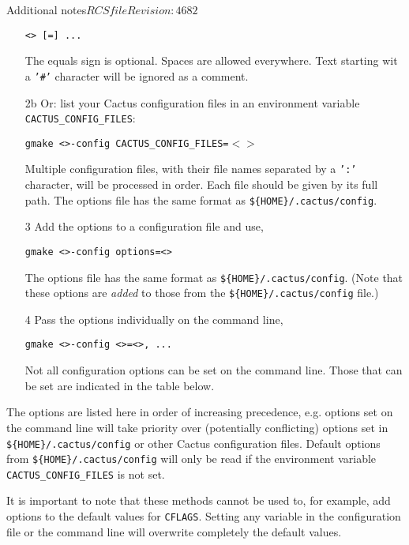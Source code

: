 \begin{cactuspart}{Additional notes}{$RCSfile$}{$Revision: 4682 $}
\begin{enumerate}
    \texttt{<> [=] ...}

    The equals sign is optional. Spaces are allowed everywhere.
    Text starting wit a \texttt{'\#'} character will be ignored as a comment.

  \item[2b]{}
    Or: list your Cactus configuration files in an environment variable
    \texttt{CACTUS\_CONFIG\_FILES}:

    \texttt{gmake <>-config
                  CACTUS\_CONFIG\_FILES=$<$$>$}

    Multiple configuration files, with their file names separated by a
    \texttt{':'} character, will be processed in order.
    Each file should be given by its full path.
    The options file has the same format as \texttt{\$\{HOME\}/.cactus/config}.

  \item[3]{}
    Add the options to a configuration file and use,

    \texttt{gmake <>-config  options=<>}

    The options file has the same format as \texttt{\$\{HOME\}/.cactus/config}.
    (Note that these options are \emph{added} to those from the
    \texttt{\$\{HOME\}/.cactus/config} file.)

  \item[4]{}
    Pass the options individually on the command line,

    \texttt{gmake <>-config
                           <>=<>, ...}

    Not all configuration options can be set on the command line.
    Those that can be set are indicated in the table below.
\end{enumerate}

The options are listed here in order of increasing precedence, e.g. options
set on the command line will take priority over (potentially
conflicting) options set in \texttt{\$\{HOME\}/.cactus/config} or other
Cactus configuration files. Default options from
\texttt{\$\{HOME\}/.cactus/config} will only be read if the
environment variable \texttt{CACTUS\_CONFIG\_FILES} is not set.

It is important to note that these methods cannot be used to, for example, add
options to the default values for \texttt{CFLAGS}.  Setting any variable in the
configuration file or the command line will overwrite completely the
default values.


\end{cactuspart}
